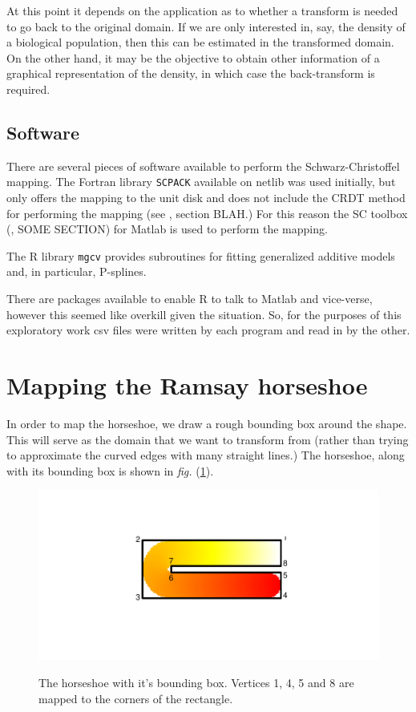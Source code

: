 \documentclass[a4paper,10pt]{amsart}
\newcommand{\sch}{Schwarz-Christoffel }
\newcommand{\fig}[1]{\emph{fig.} (\ref{#1})}
\begin{document}
At this point it depends on the application as to whether a transform is needed to go back to the original domain. If we are only interested in, say, the density of a biological population, then this can be estimated in the transformed domain. On the other hand, it may be the objective to obtain other information of a graphical representation of the density, in which case the back-transform is required.



\subsection{Software}

There are several pieces of software available to perform the \sch mapping. The Fortran library \texttt{SCPACK} available on netlib was used initially, but only offers the mapping to the unit disk and does not include the CRDT method for performing the mapping (see \cite{miller08}, section BLAH.) For this reason the SC toolbox (\cite{driscoll}, SOME SECTION) for Matlab is used to perform the mapping. 

The \textsf{R} library \texttt{mgcv} provides subroutines for fitting generalized additive models and, in particular, P-splines.

There are packages available to enable \textsf{R} to talk to Matlab and vice-verse, however this seemed like overkill given the situation. So, for the purposes of this exploratory work csv files were written by each program and read in by the other.

\section{Mapping the Ramsay horseshoe}

In order to map the horseshoe, we draw a rough bounding box around the shape. This will serve as the domain that we want to transform from (rather than trying to approximate the curved edges with many straight lines.) The horseshoe, along with its bounding box is shown in \fig{hswithboundingbox}.

\begin{figure}
\centering
\includegraphics[trim=0.5in 1in 0in 1in]{figs/hswithboundingbox.pdf} \\
\caption{The horseshoe with it's bounding box. Vertices 1, 4, 5 and 8 are mapped to the corners of the rectangle.}
\label{hswithboundingbox}
\end{figure}
\end{document}
